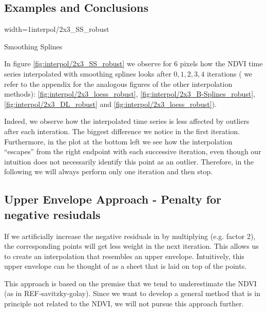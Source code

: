 {	\subsection{Examples and Conclusions}{
		\begin{my_figure}[h]{width=1\textwidth}{interpol/2x3_SS_robust}
			\caption{Smoothing Splines \RobItPlot}
			\label{fig:interpol/2x3_SS_robust}
		\end{my_figure}

		In figure \ref{fig:interpol/2x3_SS_robust} we observe for 6 pixels how the NDVI time series interpolated with smoothing splines looks after $0,1,2,3,4$ iterations ( we refer to the appendix for the analogous figures of the other interpolation methods): \ref{fig:interpol/2x3_loess_robust}, \ref{fig:interpol/2x3_B-Splines_robust}, \ref{fig:interpol/2x3_DL_robust} and \ref{fig:interpol/2x3_loess_robust}).
		
		Indeed, we observe how the interpolated time series is less affected by outliers after each interation. The biggest difference we notice in the first iteration. Furthermore, in the plot at the bottom left we see how the interpolation ``escapes'' from the right endpoint with each successive iteration, even though our intuition does not necessarily identify this point as an outlier. Therefore, in the following we will always perform only one iteration and then stop.

	} 
	
	\subsection{Upper Envelope Approach - Penalty for negative resiudals}
		If we artificially increase the negative residuals in  by multiplying (e.g. factor 2), the corresponding points will get less weight in the next iteration. This allows us to create an interpolation that resembles an upper envelope. Intuitively, this upper envelope can be thought of as a sheet that is laid on top of the points.
			
		This approach is based on the premise that we tend to underestimate the NDVI (as in REF-savitzky-golay). Since we want to develop a general method that is in principle not related to the NDVI, we will not pursue this approach further.	
}
